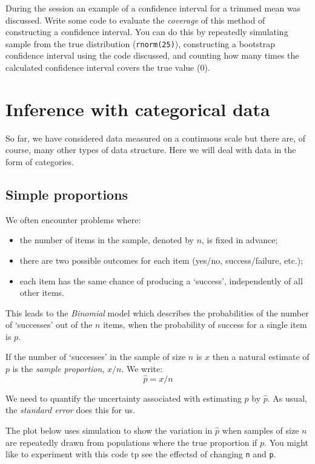 \documentclass[
]{book}
\providecommand{\tightlist}{%
  \setlength{\itemsep}{0pt}\setlength{\parskip}{0pt}}
\begin{document}
During the session an example of a confidence interval for a trimmed mean was discussed. Write some code to evaluate the \emph{coverage} of this method of constructing a confidence interval. You can do this by repeatedly simulating sample from the true distribution (\texttt{rnorm(25)}), constructing a bootstrap confidence interval using the code discussed, and counting how many times the calculated confidence interval covers the true value (0).

\chapter{Inference with categorical data}\label{inference-with-categorical-data}

So far, we have considered data measured on a continuous scale but there are, of course, many other types of data structure. Here we will deal with data in the form of categories.

\section{Simple proportions}\label{simple-proportions}

We often encounter problems where:

\begin{itemize}
\tightlist
\item
  the number of items in the sample, denoted by \(n\), is fixed in advance;
\item
  there are two possible outcomes for each item (yes/no, success/failure, etc.);
\item
  each item has the same chance of producing a `success', independently of all other items.
\end{itemize}

This leads to the \emph{Binomial} model which describes the probabilities of the number of `successes' out of the \(n\) items, when the probability of success for a single item is \(p\).

If the number of `successes' in the sample of size \(n\) is \(x\) then a natural estimate of
\(p\) is the \emph{sample proportion}, \(x/n\). We write:
\[
                  \hat{p} = x/n
\]

We need to quantify the uncertainty associated with estimating \(p\) by \(\hat{p}\). As usual, the \emph{standard error} does this for us.

The plot below uses simulation to show the variation in \(\hat{p}\) when samples of size \(n\) are repeatedly drawn from populations where the true proportion if \(p\). You might like to experiment with this code tp see the effectsd of changing \texttt{n} and \texttt{p}.
\end{document}

